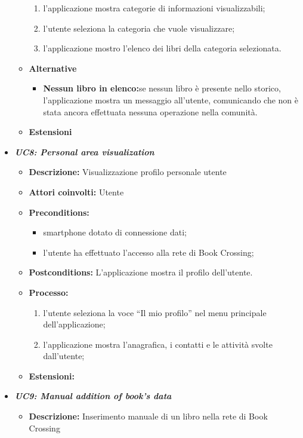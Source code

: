 \begin{itemize}
\begin{itemize}
\begin{enumerate}
			\item l’applicazione mostra categorie di informazioni visualizzabili;
			\item l’utente seleziona la categoria che vuole visualizzare;
			\item l'applicazione mostro l'elenco dei libri della categoria selezionata.
		\end{enumerate}
		\item \textbf{Alternative}
		\begin{itemize}
			\item \textbf{Nessun libro in elenco:}se nessun libro è presente nello storico, l'applicazione mostra un messaggio all'utente, comunicando che non è stata ancora effettuata nessuna operazione nella comunità.
		\end{itemize}
		\item \textbf{Estensioni}
	\end{itemize}
	\item \textbf{\textit{UC8: Personal area visualization}}
	\begin{itemize}
		\item \textbf{Descrizione: } Visualizzazione profilo personale utente
		\item \textbf{Attori coinvolti:} Utente
		\item \textbf{Preconditions:}
		\begin{itemize}
			\item smartphone dotato di connessione dati;
			\item l’utente ha effettuato l’accesso alla rete di Book Crossing;
		\end{itemize}
		\item \textbf{Postconditions: }L’applicazione mostra il profilo dell’utente.
		\item \textbf{Processo: }
		\begin{enumerate}
			\item l’utente seleziona la voce “Il mio profilo” nel menu principale dell’applicazione;
			\item l’applicazione mostra l’anagrafica, i contatti e le attività svolte dall’utente;
		\end{enumerate}
		\item \textbf{Estensioni:}
	\end{itemize}
	\item \textbf{\textit{UC9: Manual addition of book's data}}
	\begin{itemize}
		\item \textbf{Descrizione:} Inserimento manuale di un libro nella rete di Book Crossing

\end{itemize}
\end{itemize}
